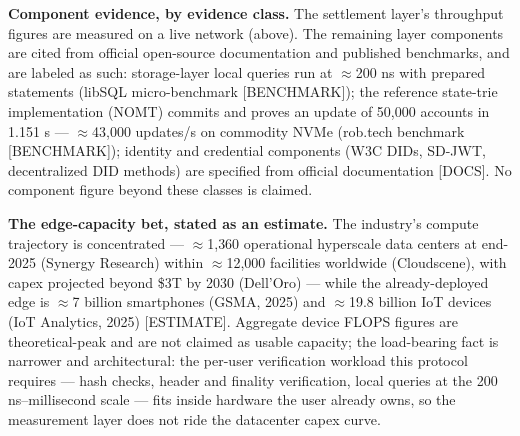\documentclass[11pt,twocolumn]{article}
\begin{document}
\textbf{Component evidence, by evidence class.} The settlement layer's throughput figures are measured on a live network (above). The remaining layer components are cited from official open-source documentation and published benchmarks, and are labeled as such: storage-layer local queries run at $\approx$200 ns with prepared statements (libSQL micro-benchmark [BENCHMARK]); the reference state-trie implementation (NOMT) commits and proves an update of 50{,}000 accounts in 1.151 s --- $\approx$43{,}000 updates/s on commodity NVMe (rob.tech benchmark [BENCHMARK]); identity and credential components (W3C DIDs, SD-JWT, decentralized DID methods) are specified from official documentation [DOCS]. No component figure beyond these classes is claimed.

\textbf{The edge-capacity bet, stated as an estimate.} The industry's compute trajectory is concentrated --- $\approx$1{,}360 operational hyperscale data centers at end-2025 (Synergy Research) within $\approx$12{,}000 facilities worldwide (Cloudscene), with capex projected beyond \$3T by 2030 (Dell'Oro) --- while the already-deployed edge is $\approx$7 billion smartphones (GSMA, 2025) and $\approx$19.8 billion IoT devices (IoT Analytics, 2025) [ESTIMATE]. Aggregate device FLOPS figures are theoretical-peak and are not claimed as usable capacity; the load-bearing fact is narrower and architectural: the per-user verification workload this protocol requires --- hash checks, header and finality verification, local queries at the 200 ns--millisecond scale --- fits inside hardware the user already owns, so the measurement layer does not ride the datacenter capex curve.
\end{document}
